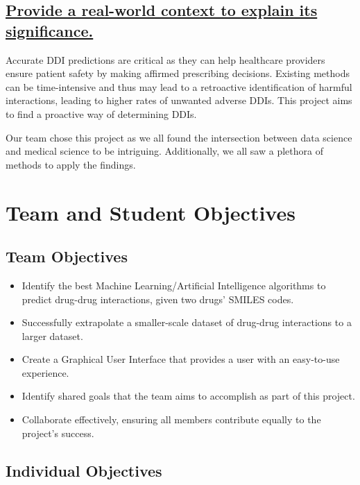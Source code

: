 \documentclass{report}
\begin{document}
\subsection{\underline{Provide a real-world context to explain its significance.}}

Accurate DDI predictions are critical as they can help healthcare providers ensure patient safety by making affirmed prescribing decisions. Existing methods can be time-intensive and thus may lead to a retroactive identification of harmful interactions, leading to higher rates of unwanted adverse DDIs. This project aims to find a proactive way of determining DDIs. 

Our team chose this project as we all found the intersection between data science and medical science to be intriguing. Additionally, we all saw a plethora of methods to apply the findings. 


\section{Team and Student Objectives}
\subsection{Team Objectives}
\begin{itemize}
    \item{Identify the best Machine Learning/Artificial Intelligence algorithms to predict drug-drug interactions, given two drugs’ SMILES codes.}
    \item{Successfully extrapolate a smaller-scale dataset of drug-drug interactions to a larger dataset.}
    \item{Create a Graphical User Interface that provides a user with an easy-to-use experience.}
    \item{Identify shared goals that the team aims to accomplish as part of this project.}
    \item{Collaborate effectively, ensuring all members contribute equally to the project’s success.}
\end{itemize}

\subsection{Individual Objectives}
\end{document}
